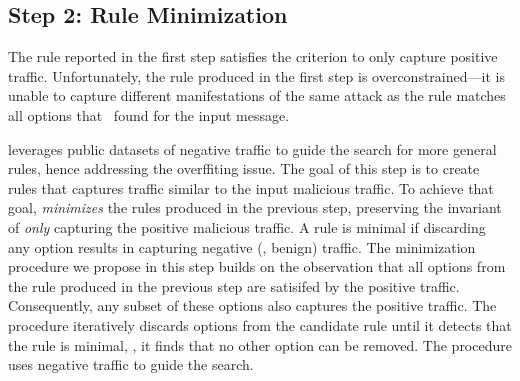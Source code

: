\documentclass[sigconf,anonymous]{acmart}
\begin{document}
\subsection{Step 2: Rule Minimization}
\label{sec:minimization}

The rule reported in the first step satisfies the criterion to only
capture positive traffic. Unfortunately, the rule produced in the
first step is overconstrained---it is unable to capture different
manifestations of the same attack as the rule matches all options that
\tname\ found for the input message.


\tname{} leverages public datasets\cite{tcpreplay} of negative traffic
to guide the search for more general rules, hence addressing the
overffiting issue. The goal of this step is to create rules that
captures traffic similar to the input malicious traffic. To achieve
that goal, \tname{} \emph{minimizes} the rules produced in the
previous step, preserving the invariant of \emph{only} capturing the
positive malicious traffic. A rule is minimal if discarding any option
results in capturing negative (\ie{}, benign) traffic.  The
minimization procedure we propose in this step builds on the
observation that all options from the rule produced in the previous
step are satisifed by the positive traffic. Consequently, any subset
of these options also captures the positive traffic. The procedure
iteratively discards options from the candidate rule until it detects
that the rule is minimal, \ie{}, it finds that no other option can be
removed. The procedure uses negative traffic to guide the search.
\end{document}
